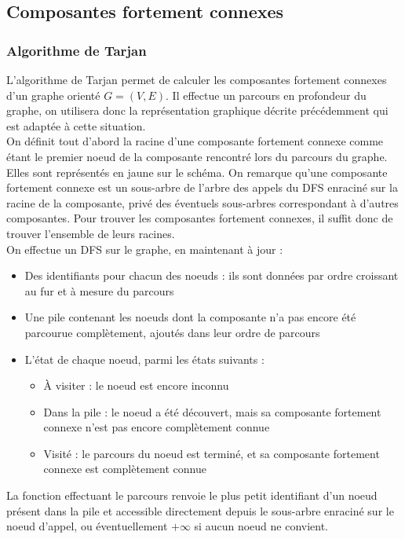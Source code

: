 \documentclass[11pt,a4paper]{article}
\begin{document}
  \subsection{Composantes fortement connexes}

    \subsubsection{Algorithme de Tarjan}
L'algorithme de Tarjan permet de calculer les composantes fortement connexes d'un graphe orienté \(G=(V,E)\). Il effectue un parcours en profondeur du graphe, on utilisera donc la représentation graphique décrite précédemment qui est adaptée à cette situation. \\
On définit tout d'abord la racine d'une composante fortement connexe comme étant le premier noeud de la composante rencontré lors du parcours du graphe. Elles sont représentés en jaune sur le schéma. On remarque qu'une composante fortement connexe est un sous-arbre de l'arbre des appels du DFS enraciné sur la racine de la composante, privé des éventuels sous-arbres correspondant à d'autres composantes. Pour trouver les composantes fortement connexes, il suffit donc de trouver l'ensemble de leurs racines. \\
On effectue un DFS sur le graphe, en maintenant à jour :
\begin{itemize}
  \item Des identifiants pour chacun des noeuds : ils sont données par ordre croissant au fur et à mesure du parcours
  \item Une pile contenant les noeuds dont la composante n'a pas encore été parcourue complètement, ajoutés dans leur ordre de parcours
  \item L'état de chaque noeud, parmi les états suivants :
    \begin{itemize}
      \item À visiter : le noeud est encore inconnu
      \item Dans la pile : le noeud a été découvert, mais sa composante fortement connexe n'est pas encore complètement connue
      \item Visité : le parcours du noeud est terminé, et sa composante fortement connexe est complètement connue
    \end{itemize}
\end{itemize}
La fonction effectuant le parcours renvoie le plus petit identifiant d'un noeud présent dans la pile et accessible directement depuis le sous-arbre enraciné sur le noeud d'appel, ou éventuellement \(+\infty\) si aucun noeud ne convient.
\end{document}
